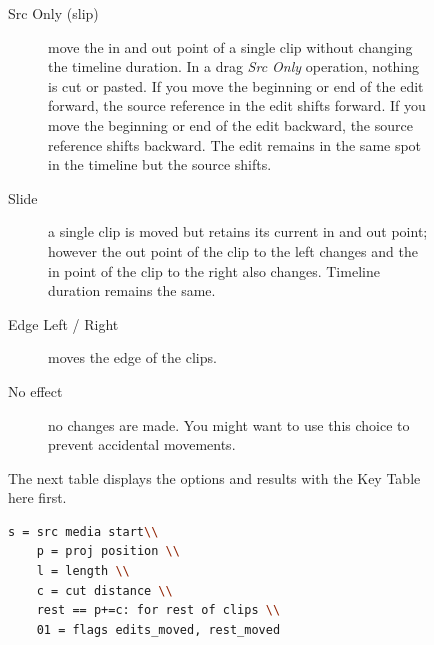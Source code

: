 \begin{figure}
\begin{description}
    \item[Src Only (slip)] move the in and out point of a single clip without changing the timeline duration. In a drag \textit{Src Only} operation, nothing is cut or pasted. If you move the beginning or end of the edit forward, the source reference in the edit shifts forward. If you move the beginning or end of the edit backward, the source reference shifts backward. The edit remains in the same spot in the timeline but the source shifts.
    \item[Slide] a single clip is moved but retains its current in and out point; however the out point of the clip to the left changes and the in point of the clip to the right also changes.  Timeline duration remains the same.
    \item[Edge Left / Right] moves the edge of the clips.
    \item[No effect] no changes are made.  You might want to use this choice to prevent accidental movements.
\end{description}
The next table displays the options and results with the Key Table here first.

\begin{lstlisting}[language=bash]
    s = src media start\\
    p = proj position \\
    l = length \\
    c = cut distance \\
    rest == p+=c: for rest of clips \\
    01 = flags edits_moved, rest_moved
\end{lstlisting}



\end{figure}

